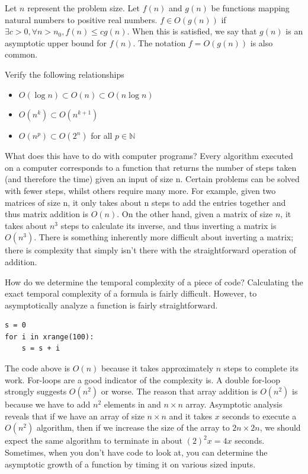 \begin{definition}
Let $n$ represent the problem size.  Let $f(n)$ and $g(n)$ be functions mapping natural numbers to positive real numbers. 
$f \in O(g(n))$ if $\exists c > 0, \forall n > n_0, f(n) \leq cg(n)$. 
When this is satisfied, we say that $g(n)$ is an asymptotic upper bound for $f(n)$. 
The notation $f = O(g(n))$ is also common.
\end{definition}

\begin{problem}
Verify the following relationships
\begin{itemize}
\item $O(\log{n}) \subset O(n) \subset O(n\log{n})$
\item $O(n^k) \subset O(n^{k+1})$
\item $O(n^p) \subset O(2^n)$ for all $p \in \mathbb{N}$
\end{itemize}
\end{problem}

What does this have to do with computer programs?  
Every algorithm executed on a computer corresponds to a function 
that returns the number of steps taken (and therefore the time) 
given an input of size n.  Certain problems can be solved with fewer steps,
whilst others require many more.  For example, given two matrices of size n,
it only takes about n steps to add the entries together and thus matrix addition is $O(n)$.  
On the other hand, given a matrix of size $n$, it takes about 
$n^3$ steps to calculate its inverse, 
and thus inverting a matrix is $O(n^3)$.
There is something inherently more difficult about inverting a matrix; 
there is complexity that simply isn't there with the straightforward operation of addition.

How do we determine the temporal complexity of a piece of code?
Calculating the exact temporal complexity of a formula is fairly difficult.
However, to asymptotically analyze a function is fairly straightforward.
\begin{lstlisting}
s = 0
for i in xrange(100):
    s = s + i
\end{lstlisting}
The code above is $O(n)$ because it takes approximately $n$ steps to complete its work.
For-loops are a good indicator of the complexity is.  A double for-loop strongly suggests
$O(n^2)$ or worse.  The reason that array addition is $O(n^2)$ is because we have to add
$n^2$ elements in and $n \times n$ array.  Asymptotic analysis reveals that
if we have an array of size $n \times n$ and it takes $x$ seconds to execute a $O(n^2)$ algorithm,
then if we increase the size of the array to $2n \times 2n$, we should expect the same algorithm
to terminate in about $(2)^2 x = 4x$ seconds.  Sometimes, when you don't have code to look at, 
you can determine the asymptotic growth of a function by timing it on various sized inputs.

